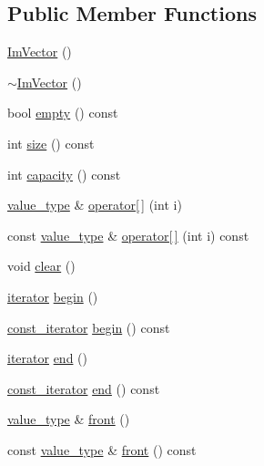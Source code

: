 \subsection*{Public Member Functions}
\begin{DoxyCompactItemize}
\item 
\hyperlink{class_im_vector_a547fff373659fd848c3ecc6b25a83f25}{Im\+Vector} ()
\item 
\hyperlink{class_im_vector_a9b782359ca26eaa1a6a6138fcf341c54}{$\sim$\+Im\+Vector} ()
\item 
bool \hyperlink{class_im_vector_aa53e48a5272f4bad1099368769514ff1}{empty} () const
\item 
int \hyperlink{class_im_vector_a8c903ecb1aaee0601b6a8ad835a4a435}{size} () const
\item 
int \hyperlink{class_im_vector_ac17681baa8b9b5cd97e556da29f9ef73}{capacity} () const
\item 
\hyperlink{class_im_vector_a8bd77e4e7581d8e5f9e98d7c2f3c2a80}{value\+\_\+type} \& \hyperlink{class_im_vector_a59a3eeadda07579727de93ca6844b91e}{operator\mbox{[}$\,$\mbox{]}} (int i)
\item 
const \hyperlink{class_im_vector_a8bd77e4e7581d8e5f9e98d7c2f3c2a80}{value\+\_\+type} \& \hyperlink{class_im_vector_ab97c3f6f1943602e36afb593c6f03ff1}{operator\mbox{[}$\,$\mbox{]}} (int i) const
\item 
void \hyperlink{class_im_vector_ae2d401b4ec5f1113cdb8edb5a61a38f7}{clear} ()
\item 
\hyperlink{class_im_vector_a74b5478f1f6fd471cc71219bce483db6}{iterator} \hyperlink{class_im_vector_a300a8b559cd87a78063046ef81151bce}{begin} ()
\item 
\hyperlink{class_im_vector_aedeac9c5080f9d6ce96ae837768ee4c4}{const\+\_\+iterator} \hyperlink{class_im_vector_ac72cd4105b5c6a7f76157df945b39d4c}{begin} () const
\item 
\hyperlink{class_im_vector_a74b5478f1f6fd471cc71219bce483db6}{iterator} \hyperlink{class_im_vector_a947fbc3b1d8c1997e51ae6caab440379}{end} ()
\item 
\hyperlink{class_im_vector_aedeac9c5080f9d6ce96ae837768ee4c4}{const\+\_\+iterator} \hyperlink{class_im_vector_a06efa87357864d1c130f0f400eeccf8d}{end} () const
\item 
\hyperlink{class_im_vector_a8bd77e4e7581d8e5f9e98d7c2f3c2a80}{value\+\_\+type} \& \hyperlink{class_im_vector_a5b0108d6b1a4a11609723f8305fb9011}{front} ()
\item 
const \hyperlink{class_im_vector_a8bd77e4e7581d8e5f9e98d7c2f3c2a80}{value\+\_\+type} \& \hyperlink{class_im_vector_a76dc6bb045574ba79b15a1941b662597}{front} () const

\end{DoxyCompactItemize}
